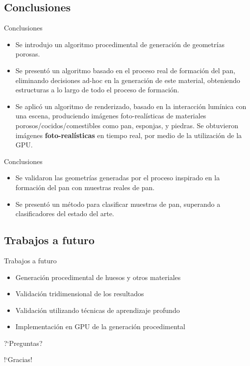 \documentclass[spanish]{beamer}
\begin{document}
\subsection{Conclusiones}
\begin{frame}{Conclusiones}
\begin{block}{}
\begin{itemize}
\item Se introdujo un algoritmo procedimental de generación de geometrías porosas.
\item Se presentó un algoritmo basado en el proceso real de formación del pan, eliminando decisiones ad-hoc en la generación de este material, obteniendo estructuras a lo largo de todo el proceso de formación.
\item Se aplicó un algoritmo de renderizado, basado en la interacción lumínica con una escena, produciendo imágenes foto-realísticas de materiales porosos/cocidos/comestibles como pan, esponjas, y piedras. Se obtuvieron imágenes \textbf{foto-realísticas} en tiempo real, por medio de la utilización de la GPU.
\end{itemize}
\end{block}
\end{frame}

\begin{frame}{Conclusiones}
\begin{block}{}
\begin{itemize}
\item Se validaron las geometrías generadas por el proceso inspirado en la formación del pan con muestras reales de pan.
\item Se presentó un método para clasificar muestras de pan, superando a clasificadores del estado del arte.
\end{itemize}
\end{block}
\end{frame}

\subsection{Trabajos a futuro}

\begin{frame}{Trabajos a futuro}
\begin{block}{}
\begin{itemize}
\item Generación procedimental de huesos y otros materiales
\item Validación tridimensional de los resultados
\item Validación utilizando técnicas de aprendizaje profundo
\item Implementación en GPU de la generación procedimental
\end{itemize}
\end{block}
\end{frame}

\begin{frame}
\centering

?`Preguntas?

\end{frame}

\begin{frame}
\centering

!`Gracias!

\end{frame}
\end{document}
